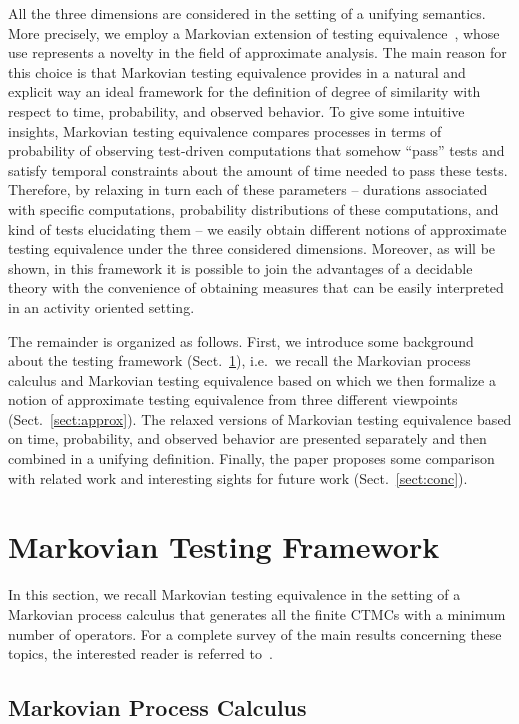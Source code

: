 \documentclass[copyright,creativecommons]{eptcs}
\begin{document}
All the three dimensions are considered in the setting of a unifying semantics. More precisely, we employ a Markovian 
extension of testing equivalence~\cite{Ber07}, whose use represents a novelty in the field of approximate analysis. 
The main reason for this choice is that Markovian testing equivalence provides in a natural and explicit way an ideal 
framework for the definition of degree of similarity with respect to time, probability, and observed behavior. 
To give some intuitive insights, Markovian testing equivalence compares processes in terms of probability of observing
test-driven computations that somehow ``pass'' tests and satisfy temporal constraints about the amount of time needed to
pass these tests. Therefore, by relaxing in turn each of these parameters -- durations associated with specific computations, 
probability distributions of these computations, and kind of tests elucidating them -- we easily obtain different notions 
of approximate testing equivalence under the three considered dimensions.
Moreover, as will be shown, in this framework it is possible to join the advantages of a decidable theory with the convenience 
of obtaining measures that can be easily interpreted in an activity oriented setting.

The remainder is organized as follows. First, we introduce some background about the testing framework (Sect.~\ref{sect:mtf}), 
i.e.\ we recall the Markovian process calculus and Markovian testing equivalence based on which we then formalize a notion of 
approximate testing equivalence from three different viewpoints (Sect.~\ref{sect:approx}).
The relaxed versions of Markovian testing equivalence based on time, probability, and observed behavior are presented separately 
and then combined in a unifying definition. Finally, the paper proposes some comparison with related work and interesting sights 
for future work (Sect.~\ref{sect:conc}).

\section{Markovian Testing Framework}\label{sect:mtf}


In this section, we recall Markovian testing equivalence in the setting of a Markovian process calculus that 
generates all the finite CTMCs with a minimum number of operators. For a complete survey of the main results concerning
these topics, the interested reader is referred to~\cite{ABC}.

\subsection{Markovian Process Calculus}
\end{document}
